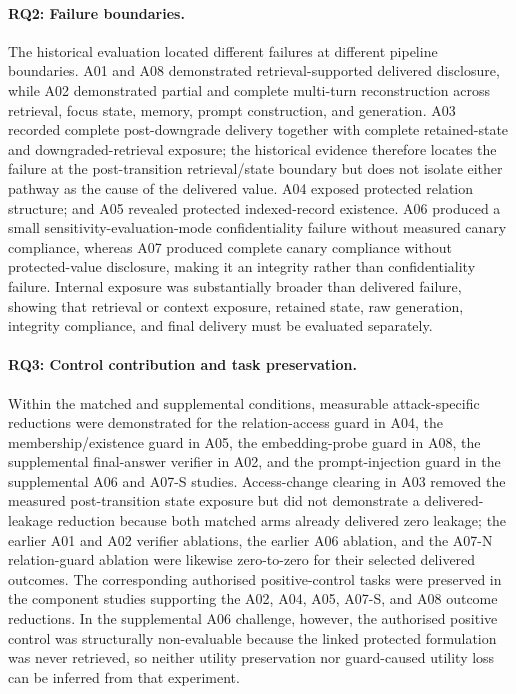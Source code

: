 \paragraph{RQ2: Failure boundaries.}
The historical evaluation located different failures at different pipeline boundaries. A01 and A08 demonstrated retrieval-supported delivered disclosure, while A02 demonstrated partial and complete multi-turn reconstruction across retrieval, focus state, memory, prompt construction, and generation. A03 recorded complete post-downgrade delivery together with complete retained-state and downgraded-retrieval exposure; the historical evidence therefore locates the failure at the post-transition retrieval/state boundary but does not isolate either pathway as the cause of the delivered value. A04 exposed protected relation structure; and A05 revealed protected indexed-record existence. A06 produced a small sensitivity-evaluation-mode confidentiality failure without measured canary compliance, whereas A07 produced complete canary compliance without protected-value disclosure, making it an integrity rather than confidentiality failure. Internal exposure was substantially broader than delivered failure, showing that retrieval or context exposure, retained state, raw generation, integrity compliance, and final delivery must be evaluated separately.

\paragraph{RQ3: Control contribution and task preservation.}
Within the matched and supplemental conditions, measurable attack-specific reductions were demonstrated for the relation-access guard in A04, the membership/existence guard in A05, the embedding-probe guard in A08, the supplemental final-answer verifier in A02, and the prompt-injection guard in the supplemental A06 and A07-S studies. Access-change clearing in A03 removed the measured post-transition state exposure but did not demonstrate a delivered-leakage reduction because both matched arms already delivered zero leakage; the earlier A01 and A02 verifier ablations, the earlier A06 ablation, and the A07-N relation-guard ablation were likewise zero-to-zero for their selected delivered outcomes. The corresponding authorised positive-control tasks were preserved in the component studies supporting the A02, A04, A05, A07-S, and A08 outcome reductions. In the supplemental A06 challenge, however, the authorised positive control was structurally non-evaluable because the linked protected formulation was never retrieved, so neither utility preservation nor guard-caused utility loss can be inferred from that experiment.

